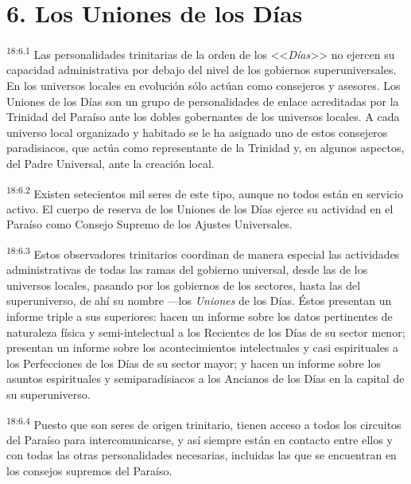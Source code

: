 \section*{6. Los Uniones de los Días}
\par
\textsuperscript{18:6.1} Las personalidades trinitarias de la orden de los <<\textit{Días}>> no ejercen su capacidad administrativa por debajo del nivel de los gobiernos superuniversales. En los universos locales en evolución sólo actúan como consejeros y asesores. Los Uniones de los Días son un grupo de personalidades de enlace acreditadas por la Trinidad del Paraíso ante los dobles gobernantes de los universos locales. A cada universo local organizado y habitado se le ha asignado uno de estos consejeros paradisiacos, que actúa como representante de la Trinidad y, en algunos aspectos, del Padre Universal, ante la creación local.

\par
\textsuperscript{18:6.2} Existen setecientos mil seres de este tipo, aunque no todos están en servicio activo. El cuerpo de reserva de los Uniones de los Días ejerce su actividad en el Paraíso como Consejo Supremo de los Ajustes Universales.

\par
\textsuperscript{18:6.3} Estos observadores trinitarios coordinan de manera especial las actividades administrativas de todas las ramas del gobierno universal, desde las de los universos locales, pasando por los gobiernos de los sectores, hasta las del superuniverso, de ahí su nombre ---los \textit{Uniones} de los Días. Éstos presentan un informe triple a sus superiores: hacen un informe sobre los datos pertinentes de naturaleza física y semi-intelectual a los Recientes de los Días de su sector menor; presentan un informe sobre los acontecimientos intelectuales y casi espirituales a los Perfecciones de los Días de su sector mayor; y hacen un informe sobre los asuntos espirituales y semiparadisiacos a los Ancianos de los Días en la capital de su superuniverso.

\par
\textsuperscript{18:6.4} Puesto que son seres de origen trinitario, tienen acceso a todos los circuitos del Paraíso para intercomunicarse, y así siempre están en contacto entre ellos y con todas las otras personalidades necesarias, incluidas las que se encuentran en los consejos supremos del Paraíso.

